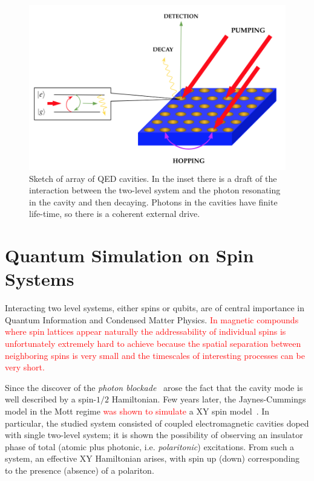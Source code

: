 \begin{figure}
    \centering
    \includegraphics[scale=0.7]{Figures/QED_cavity.png}
    \caption{Sketch of array of QED cavities. In the inset there is a draft of the interaction between the two-level system and the photon resonating in the cavity and then decaying. Photons in the cavities have finite life-time, so there is a coherent external drive.}
    \label{fig:QED_cavities}
\end{figure}


\section{Quantum Simulation on Spin Systems}
Interacting two level systems, either spins or qubits, are of central importance in Quantum Information and Condensed Matter Physics. \textcolor{red}{In magnetic compounds where spin lattices appear naturally the addressability of individual spins is unfortunately extremely hard to achieve because the spatial separation between neighboring spins is very small and the timescales of interesting processes can be very short.}

Since the discover of the \emph{photon blockade}~\cite{ph_blockade} arose the fact that the cavity mode is well described by a spin-$1/2$ Hamiltonian. Few years later, the Jaynes-Cummings model in the Mott regime \textcolor{red}{was shown to simulate} a XY spin model~\cite{angelakis}. In particular, the studied system consisted of coupled electromagnetic cavities doped with single two-level system; it is shown the possibility of observing an insulator phase of total (atomic plus photonic, i.e. \emph{polaritonic}) excitations. From such a system, an effective XY Hamiltonian arises, with spin up (down) corresponding to the presence (absence) of a polariton.

